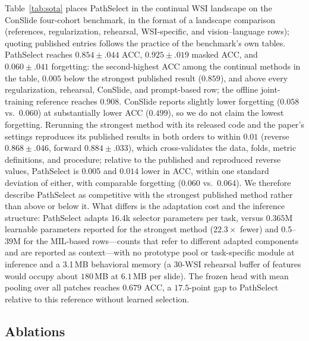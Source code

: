 \documentclass{article}
\begin{document}
Table~\ref{tab:sota} places PathSelect in the continual WSI landscape on the ConSlide four-cohort benchmark, in the format of a landscape comparison (references, regularization, rehearsal, WSI-specific, and vision--language rows); quoting published entries follows the practice of the benchmark's own tables. PathSelect reaches $0.854{\pm}.044$ ACC, $0.925{\pm}.019$ masked ACC, and $0.060{\pm}.041$ forgetting: the second-highest ACC among the continual methods in the table, $0.005$ below the strongest published result ($0.859$), and above every regularization, rehearsal, ConSlide, and prompt-based row; the offline joint-training reference reaches $0.908$. ConSlide reports slightly lower forgetting ($0.058$ vs.\ $0.060$) at substantially lower ACC ($0.499$), so we do not claim the lowest forgetting. Rerunning the strongest method with its released code and the paper's settings reproduces its published results in both orders to within $0.01$ (reverse $0.868{\pm}.046$, forward $0.884{\pm}.033$), which cross-validates the data, folds, metric definitions, and procedure; relative to the published and reproduced reverse values, PathSelect is $0.005$ and $0.014$ lower in ACC, within one standard deviation of either, with comparable forgetting ($0.060$ vs.\ $0.064$). We therefore describe PathSelect as competitive with the strongest published method rather than above or below it. What differs is the adaptation cost and the inference structure: PathSelect adapts 16.4k selector parameters per task, versus $0.365$M learnable parameters reported for the strongest method ($22.3\times$ fewer) and $0.5$--$39$M for the MIL-based rows---counts that refer to different adapted components and are reported as context---with no prototype pool or task-specific module at inference and a 3.1\,MB behavioral memory (a 30-WSI rehearsal buffer of features would occupy about $180$\,MB at $6.1$\,MB per slide). The frozen head with mean pooling over all patches reaches $0.679$ ACC, a $17.5$-point gap to PathSelect relative to this reference without learned selection.

\subsection{Ablations}
\label{ssec:ablation}
\end{document}
